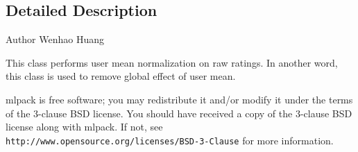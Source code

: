 \subsection{Detailed Description}
\begin{DoxyAuthor}{Author}
Wenhao Huang
\end{DoxyAuthor}
This class performs user mean normalization on raw ratings. In another word, this class is used to remove global effect of user mean.

mlpack is free software; you may redistribute it and/or modify it under the terms of the 3-\/clause B\+SD license. You should have received a copy of the 3-\/clause B\+SD license along with mlpack. If not, see {\tt http\+://www.\+opensource.\+org/licenses/\+B\+S\+D-\/3-\/\+Clause} for more information. 